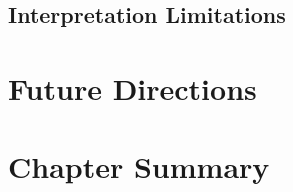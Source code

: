 \subsection{Interpretation Limitations}
\label{subsec:discuss_limit_interpretation}

%
%
%
%


\section{Future Directions}
\label{sec:discuss_future}

%
%
%
%
%
%
%
%
%


\section{Chapter Summary}
\label{sec:discuss_summary}

%
%
